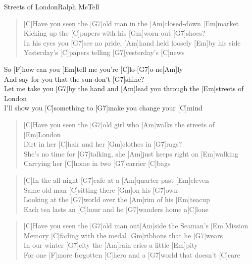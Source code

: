\begin{song}{Streets of London}{Ralph McTell}

    \begin{verse}
        [C]Have you seen the [G7]old man in the [Am]closed-down [Em]market \\
        [F]Kicking up the [C]papers with his [Gm]worn out [G7]shoes? \\
        [C]In his eyes you [G7]see no pride, [Am]hand held loosely [Em]by his side \\
        [F]Yesterday's [C]papers telling [G7]yesterday's [C]news 
    \end{verse}

    \begin{chorus}
        So [F]how can you [Em]tell me you're [C]lo-[G7]o-ne[Am]ly\\
        [G]And say for you that the sun don't [G7]shine?\\
        [C]Let me take you [G7]by the hand and [Am]lead you through the [Em]streets of London\\
        [F]I'll show you [C]something to [G7]make you change your [C]mind
    \end{chorus}

    \begin{verse}
        [C]Have you seen the [G7]old girl who [Am]walks the streets of [Em]London \\
        [F]Dirt in her [C]hair and her [Gm]clothes in [G7]rags? \\
        [C]She's no time for [G7]talking, she [Am]just keeps right on [Em]walking \\
        [F]Carrying her [C]home in two [G7]carrier [C]bags
    \end{verse}


    \begin{verse}
        [C]In the all-night [G7]cafe at a [Am]quarter past [Em]eleven \\
        [F]Same old man [C]sitting there [Gm]on his [G7]own \\
        [C]Looking at the [G7]world over the [Am]rim of his [Em]teacup \\
        [F]Each tea lasts an [C]hour and he [G7]wanders home a[C]lone
    \end{verse}


    \begin{verse}
        [C]Have you seen the [G7]old man out[Am]side the Seaman's [Em]Mission \\
        [F]Memory [C]fading with the medal [Gm]ribbons that he [G7]wears \\
        [C]In our winter [G7]city the [Am]rain cries a little [Em]pity \\
        For one [F]more forgotten [C]hero and a [G7]world that doesn't [C]care
    \end{verse}


\end{song}
